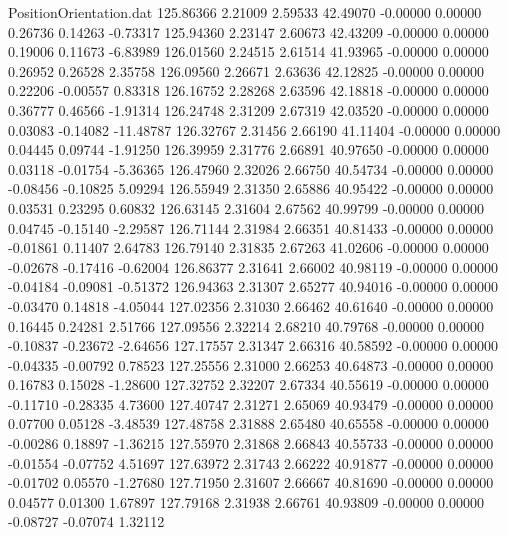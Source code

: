 \begin{filecontents}{PositionOrientation.dat}
 125.86366    2.21009    2.59533    42.49070   -0.00000    0.00000    0.26736    0.14263   -0.73317
 125.94360    2.23147    2.60673    42.43209   -0.00000    0.00000    0.19006    0.11673   -6.83989
 126.01560    2.24515    2.61514    41.93965   -0.00000    0.00000    0.26952    0.26528    2.35758
 126.09560    2.26671    2.63636    42.12825   -0.00000    0.00000    0.22206   -0.00557    0.83318
 126.16752    2.28268    2.63596    42.18818   -0.00000    0.00000    0.36777    0.46566   -1.91314
 126.24748    2.31209    2.67319    42.03520   -0.00000    0.00000    0.03083   -0.14082  -11.48787
 126.32767    2.31456    2.66190    41.11404   -0.00000    0.00000    0.04445    0.09744   -1.91250
 126.39959    2.31776    2.66891    40.97650   -0.00000    0.00000    0.03118   -0.01754   -5.36365
 126.47960    2.32026    2.66750    40.54734   -0.00000    0.00000   -0.08456   -0.10825    5.09294
 126.55949    2.31350    2.65886    40.95422   -0.00000    0.00000    0.03531    0.23295    0.60832
 126.63145    2.31604    2.67562    40.99799   -0.00000    0.00000    0.04745   -0.15140   -2.29587
 126.71144    2.31984    2.66351    40.81433   -0.00000    0.00000   -0.01861    0.11407    2.64783
 126.79140    2.31835    2.67263    41.02606   -0.00000    0.00000   -0.02678   -0.17416   -0.62004
 126.86377    2.31641    2.66002    40.98119   -0.00000    0.00000   -0.04184   -0.09081   -0.51372
 126.94363    2.31307    2.65277    40.94016   -0.00000    0.00000   -0.03470    0.14818   -4.05044
 127.02356    2.31030    2.66462    40.61640   -0.00000    0.00000    0.16445    0.24281    2.51766
 127.09556    2.32214    2.68210    40.79768   -0.00000    0.00000   -0.10837   -0.23672   -2.64656
 127.17557    2.31347    2.66316    40.58592   -0.00000    0.00000   -0.04335   -0.00792    0.78523
 127.25556    2.31000    2.66253    40.64873   -0.00000    0.00000    0.16783    0.15028   -1.28600
 127.32752    2.32207    2.67334    40.55619   -0.00000    0.00000   -0.11710   -0.28335    4.73600
 127.40747    2.31271    2.65069    40.93479   -0.00000    0.00000    0.07700    0.05128   -3.48539
 127.48758    2.31888    2.65480    40.65558   -0.00000    0.00000   -0.00286    0.18897   -1.36215
 127.55970    2.31868    2.66843    40.55733   -0.00000    0.00000   -0.01554   -0.07752    4.51697
 127.63972    2.31743    2.66222    40.91877   -0.00000    0.00000   -0.01702    0.05570   -1.27680
 127.71950    2.31607    2.66667    40.81690   -0.00000    0.00000    0.04577    0.01300    1.67897
 127.79168    2.31938    2.66761    40.93809   -0.00000    0.00000   -0.08727   -0.07074    1.32112

\end{filecontents}
